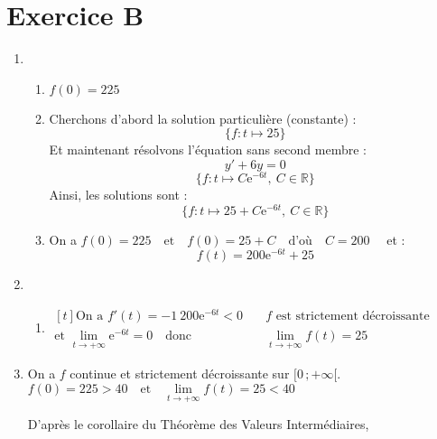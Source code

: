 \documentclass{scrartcl}
\newcommand{\me}{\mathrm{e}}
\begin{document}
    \section*{Exercice B}
    \begin{adjustwidth}{2em}{0pt}
        \begin{enumerate}
            \item	\begin{enumerate}[label=\alph*)]
                        \item	$f(0)=225$
                        \item   Cherchons d'abord la solution particulière (constante) :
                                \[\big\{f:t\mapsto 25\big\}\]
                                Et maintenant résolvons l'équation sans second membre :
                                \[y'+6y=0\]
                                \[\big\{f:t\mapsto C\me^{-6t},\ C\in\mathbb{R}\big\}\]
                                Ainsi, les solutions sont :
                                \[\boxed{\big\{f:t\mapsto 25+C\me^{-6t},\ C\in\mathbb{R}\big\}}\]
                        \item   On a $f(0)=225\quad\text{et}\quad f(0)=25+C\quad\text{d'où}\quad C=200\quad$ et : \[\boxed{f(t)=200\me^{-6t}+25}\]
                    \end{enumerate}
                    \pagebreak
            \item   \begin{enumerate}[label=\alph*)]
                        \item	$\begin{aligned}[t]
                                    \text{On a }f'(t)=-1\ 200\me^{-6t}<0\quad&\boxed{f\text{ est strictement décroissante}} \\
                                    \text{et }\lim\limits_{t\to +\infty}\me^{-6t}=0\quad\text{donc}\quad&\boxed{\lim\limits_{t\to +\infty}f(t)=25}
                                \end{aligned}$
                                \vspace{1em}
                                \begin{center}
                                \end{center}
                    \end{enumerate}
            \item   On a $f$ continue et strictement décroissante sur $\big[0\,;+\infty\big[$. \\ $f(0)=225>40\quad\text{et}\quad\lim\limits_{t\to +\infty}f(t)=25<40$ \par D'après le corollaire du Théorème des Valeurs Intermédiaires, \\ \fbox{l'équation $f(t)=40$ admet une unique solution dans $\big[0\,;+\infty\big[$}

\end{enumerate}
\end{adjustwidth}
\end{document}

